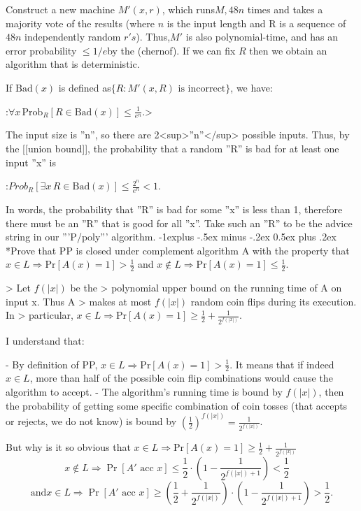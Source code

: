 \documentclass[10pt,landscape]{article}
\makeatletter
\theoremstyle{plain}%
\theoremstyle{definition}
\theoremstyle{remark}
\renewcommand{\subsection}{\@startsection{subsection}{2}{0mm}%
                                {-1explus -.5ex minus -.2ex}%
                                {0.5ex plus .2ex}%
                                {\normalfont\normalsize\bfseries}}
\makeatother
\begin{document}
\begin{multicols}{3}
Construct a new machine $M'(x,r)$, which runs$M, 48n$  times and takes a majority vote of the results (where $n$ is the input length and R is a sequence of $48n$ independently random $r's$).  Thus,$M'$ is also polynomial-time, and has an error probability $\le 1/e$by the (chernof). If we can fix $R$ then we obtain an algorithm that is deterministic.

If $\mbox{Bad}(x)$ is defined as$\{R: M{{'}}(x, R) \text{ is incorrect}\}$, we have:

:$\forall x\, \mbox{Prob}_R[R \in \mbox{Bad}(x)] \leq \frac{1}{e^n}.$>

The input size is ''n'', so there are 2<sup>''n''</sup> possible inputs. Thus, by the [[union bound]], the probability that a random ''R'' is bad for at least one input ''x'' is

:${Prob}_R [\exists x\,R \in \mbox{Bad}(x)] \leq \frac{2^n}{e^n} < 1.$

In words, the probability that ''R'' is bad for some ''x'' is less than 1, therefore there must be an ''R'' that is good for all ''x''. Take such an ''R'' to be the advice string in our '''P/poly''' algorithm.
\subsection*{Prove that PP is closed under complement}
algorithm A with the property that ${x\in L\Rightarrow \mathrm {Pr}
 [A(x) =  1]>\frac{1}{2}} $ and ${x\not \in L\Rightarrow \mathrm {Pr} [A(x) = 1]\leq \frac{1}{2}}$. 
 
> Let $f(|x|)$ be the
> polynomial upper bound on the running time of A on input x. Thus A
> makes at most $f(|x|)$ random coin flips during its execution. In
> particular, $ x\in L\Rightarrow {\mathrm  {Pr}}[A(x) = 1]\geq \frac{1}{2}+\frac{1}{2^{{f(|x|)}}}$.

I understand that:

 - By definition of PP, ${x\in L\Rightarrow \mathrm {Pr}
 [A(x) =  1]>\frac{1}{2}} $. It means that if indeed $x \in L$, more than half of the possible coin flip combinations would cause the algorithm to accept. 
 - The algorithm's running time is bound by $f(|x|)$, then the probability of getting some specific combination of coin tosses (that accepts or rejects, we do not know) is bound by $(\frac{1}{2})^{f(|x|)} = \frac{1}{2^{{f(|x|)}}}$. 


But why is it so obvious that $ x\in L\Rightarrow {\mathrm  {Pr}}[A(x) = 1]\geq \frac{1}{2}+\frac{1}{2^{{f(|x|)}}}$
\[x \not\in L \Rightarrow \Pr[A' \text{ acc } x] \le \frac{1}{2} \cdot \left (1- \frac{1}{2^{f(|x|)+1}} \right ) < \frac{1}{2} \quad\]\[ \text{and}  x \in L \Rightarrow \Pr[A' \text{ acc } x] \ge \left (\frac{1}{2}+\frac{1}{2^{f(|x|)}} \right )\cdot \left ( 1-\frac{1}{2^{f(|x|)+1}} \right ) > \frac{1}{2}.\]


\end{multicols}
\end{document}
